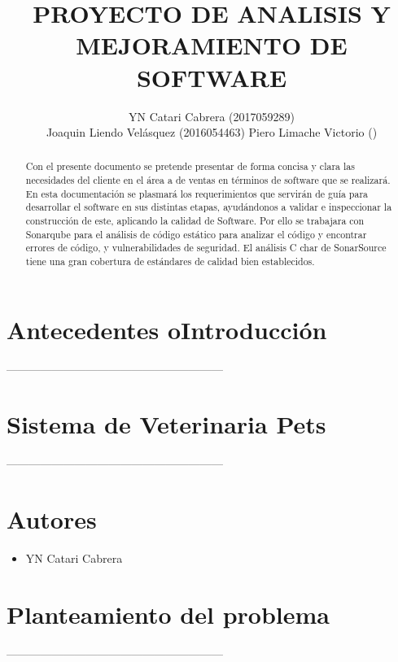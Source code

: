 \documentclass[preprint,12pt]{elsarticle}
\begin{document}
	
	\begin{frontmatter}

		\title{\huge  PROYECTO DE  ANALISIS Y  MEJORAMIENTO DE  SOFTWARE }
		\author{YN Catari Cabrera              (2017059289)\\
		Joaquin Liendo Velásquez (2016054463)
		Piero Limache Victorio ()
		}
		
		\address{Tacna, Perú}
		


\begin{abstract}
Con el presente documento se pretende presentar de forma concisa y clara las necesidades del cliente en el área a de ventas en términos de software que se realizará. 
En esta documentación se plasmará los requerimientos que servirán de guía para desarrollar el software en sus distintas etapas, ayudándonos a validar e inspeccionar la construcción de este, aplicando la calidad de Software.
Por ello se trabajara con  Sonarqube para el análisis de código estático
para analizar el código y encontrar errores de código, y vulnerabilidades de seguridad. 
El análisis C char de SonarSource tiene una gran cobertura de estándares de calidad bien establecidos.  
\end{abstract}


\end{frontmatter}
\section{Antecedentes oIntroducción}

---------------------------------------------------------

\section{Sistema de  Veterinaria Pets}
---------------------------------------------------------
\section{Autores}
\begin{itemize}
    \item YN Catari Cabrera
    
    
\end{itemize}
\section{Planteamiento del problema}
---------------------------------------------------------
\end{document}
